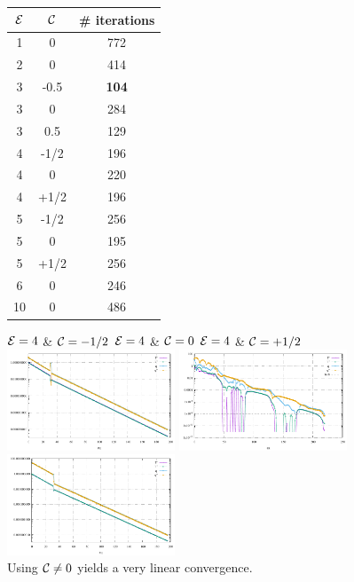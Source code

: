 \begin{center}
\begin{tabular}{ccc}
\hline
${\cal E}$ & ${\cal C}$ & \# iterations \\
\hline
1& 0 & 772 \\
2& 0 & 414 \\
3& -0.5 & {\bf 104} \\
3& 0    & 284 \\
3& 0.5 & 129 \\
4&-1/2& 196 \\
4&0   & 220 \\
4&+1/2& 196 \\
5& -1/2 & 256 \\
5& 0 & 195 \\
5& +1/2 & 256 \\
6& 0 & 246 \\
10& 0 & 486 \\
\hline
\end{tabular}
\end{center}

\begin{center}
${\cal E}=4$ \& ${\cal C}=-1/2$  \hspace{2cm}
${\cal E}=4$ \& ${\cal C}=0$ \hspace{2cm}
${\cal E}=4$ \& ${\cal C}=+1/2$\\
\includegraphics[width=5cm]{python_codes/fieldstone_57/results/E04_Cm0p5/convergence.pdf}
\includegraphics[width=5cm]{python_codes/fieldstone_57/results/E04_C000/convergence.pdf}
\includegraphics[width=5cm]{python_codes/fieldstone_57/results/E04_Cp0p5/convergence.pdf}\\
{\captionfont Using ${\cal C}\neq 0$ yields a very linear convergence.}
\end{center}


